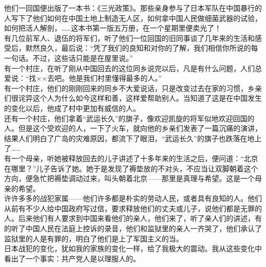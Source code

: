 他们一回国便出版了一本书：《三光政策》。那些亲身参与了日本军队在中国暴行的人写下了他们如何在中国土地上制造无人区，如何拿中国人民做细菌武器的试验，如何把活人解剖，……这本书第一版五万册，在一个星期里便卖光了！\\

有几位前军人、退伍的将军们，听了他们一位回国的旧同事谈了几年来的生活和感受后，默然良久，最后说：“凭了我们的良知和对你的了解，我们相信你所说的每一句话。不过，这些话只能是在屋里说。”\\

有一个村庄，在听了刚从中国回去的这位同乡说完以后，凡是有什么问题，人们总爱说：“找××去吧。他是我们村里懂得最多的人。”\\

有一个村庄，他们的刚刚回来的同乡不大爱说话，只是改变过去在家的习惯，乡亲们很诧异这个人为什么如今这样和善，这样爱帮助别人。当知道了这是在中国发生的变化以后，他成了村中更加有威信的人。\\

还有一个村庄，他们拿着“武运长久”的旗子，像欢迎凯旋的将军似地欢迎回国的人。但是这个受欢迎的人，一下了火车，就向他的乡亲们发表了一篇沉痛的演讲，结果人们明白了广岛的灾难原因，都流下了眼泪，“武运长久”的旗子也跌落在地上了……\\

有一个母亲，听她被释放回去的儿子讲述了十多年来的生活之后，便问道：“北京在哪里？”儿子告诉了她。她于是发现了褥垫放的不对头，不应当让双脚朝着这个方向，便急忙把褥垫调动过来，叫头朝着北京——那里是真理与希望。这是一个母亲的希望。\\

许许多多的战犯家属——他们许多都是朴实的劳动人民，或者具有良知的人。他们从前有不少人给中国政府写过信，要求释放他们的丈夫或儿子，说他们都是无罪的人。后来他们有人要求到中国来看他们的亲人，他们来了，听了亲人们的讲述，有的听了中国人民在法庭上控诉的录音，他们和监狱里的亲人一齐哭了，他们承认了监狱里的人是有罪的，明白了他们是上了军国主义的当。\\

日本战犯的变化，犹如我的家族的变化一样，给了我极大的震动。我从这些变化中看出了一个事实：共产党人是以理服人的。